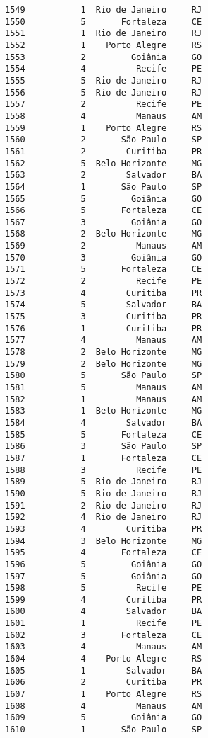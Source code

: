 \documentclass[11pt]{article}
\begin{document}
\begin{Verbatim}[commandchars=\\\{\}]
1549           1  Rio de Janeiro     RJ  
1550           5       Fortaleza     CE  
1551           1  Rio de Janeiro     RJ  
1552           1    Porto Alegre     RS  
1553           2         Goiânia     GO  
1554           4          Recife     PE  
1555           5  Rio de Janeiro     RJ  
1556           5  Rio de Janeiro     RJ  
1557           2          Recife     PE  
1558           4          Manaus     AM  
1559           1    Porto Alegre     RS  
1560           2       São Paulo     SP  
1561           2        Curitiba     PR  
1562           5  Belo Horizonte     MG  
1563           2        Salvador     BA  
1564           1       São Paulo     SP  
1565           5         Goiânia     GO  
1566           5       Fortaleza     CE  
1567           3         Goiânia     GO  
1568           2  Belo Horizonte     MG  
1569           2          Manaus     AM  
1570           3         Goiânia     GO  
1571           5       Fortaleza     CE  
1572           2          Recife     PE  
1573           4        Curitiba     PR  
1574           5        Salvador     BA  
1575           3        Curitiba     PR  
1576           1        Curitiba     PR  
1577           4          Manaus     AM  
1578           2  Belo Horizonte     MG  
1579           2  Belo Horizonte     MG  
1580           5       São Paulo     SP  
1581           5          Manaus     AM  
1582           1          Manaus     AM  
1583           1  Belo Horizonte     MG  
1584           4        Salvador     BA  
1585           5       Fortaleza     CE  
1586           3       São Paulo     SP  
1587           1       Fortaleza     CE  
1588           3          Recife     PE  
1589           5  Rio de Janeiro     RJ  
1590           5  Rio de Janeiro     RJ  
1591           2  Rio de Janeiro     RJ  
1592           4  Rio de Janeiro     RJ  
1593           4        Curitiba     PR  
1594           3  Belo Horizonte     MG  
1595           4       Fortaleza     CE  
1596           5         Goiânia     GO  
1597           5         Goiânia     GO  
1598           5          Recife     PE  
1599           4        Curitiba     PR  
1600           4        Salvador     BA  
1601           1          Recife     PE  
1602           3       Fortaleza     CE  
1603           4          Manaus     AM  
1604           4    Porto Alegre     RS  
1605           1        Salvador     BA  
1606           2        Curitiba     PR  
1607           1    Porto Alegre     RS  
1608           4          Manaus     AM  
1609           5         Goiânia     GO  
1610           1       São Paulo     SP  

\end{Verbatim}
\end{document}
